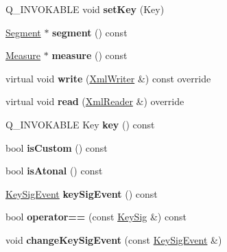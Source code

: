 \begin{DoxyCompactItemize}
Q\+\_\+\+I\+N\+V\+O\+K\+A\+B\+LE void {\bfseries set\+Key} (Key)
\item 
\mbox{\label{class_ms_1_1_key_sig_a4d793018e9602aacd74bc9f7bffea925}} 
\hyperlink{class_ms_1_1_segment}{Segment} $\ast$ {\bfseries segment} () const
\item 
\mbox{\label{class_ms_1_1_key_sig_a5807ba72878cf6417f2fdc7b17622ab7}} 
\hyperlink{class_ms_1_1_measure}{Measure} $\ast$ {\bfseries measure} () const
\item 
\mbox{\label{class_ms_1_1_key_sig_afe1043e6f82d9f1ecff50f37cb915e24}} 
virtual void {\bfseries write} (\hyperlink{class_ms_1_1_xml_writer}{Xml\+Writer} \&) const override
\item 
\mbox{\label{class_ms_1_1_key_sig_a62dd49014d94197697321eb3dcf4feb1}} 
virtual void {\bfseries read} (\hyperlink{class_ms_1_1_xml_reader}{Xml\+Reader} \&) override
\item 
\mbox{\label{class_ms_1_1_key_sig_af8b85ec70e356433fbe0e79d1dfa3276}} 
Q\+\_\+\+I\+N\+V\+O\+K\+A\+B\+LE Key {\bfseries key} () const
\item 
\mbox{\label{class_ms_1_1_key_sig_a9d29eb07a7bd7606f8c3ecfc88d11bd9}} 
bool {\bfseries is\+Custom} () const
\item 
\mbox{\label{class_ms_1_1_key_sig_a3a22be5717a47695685a0408a9a471c2}} 
bool {\bfseries is\+Atonal} () const
\item 
\mbox{\label{class_ms_1_1_key_sig_a167094029a75cd2df41ebd1b2abee522}} 
\hyperlink{class_ms_1_1_key_sig_event}{Key\+Sig\+Event} {\bfseries key\+Sig\+Event} () const
\item 
\mbox{\label{class_ms_1_1_key_sig_a285b5feb064cd72f4230eb94d5d1377a}} 
bool {\bfseries operator==} (const \hyperlink{class_ms_1_1_key_sig}{Key\+Sig} \&) const
\item 
\mbox{\label{class_ms_1_1_key_sig_a53c1ab0db30d98f2e2376f6572876fcc}} 
void {\bfseries change\+Key\+Sig\+Event} (const \hyperlink{class_ms_1_1_key_sig_event}{Key\+Sig\+Event} \&)

\end{DoxyCompactItemize}
